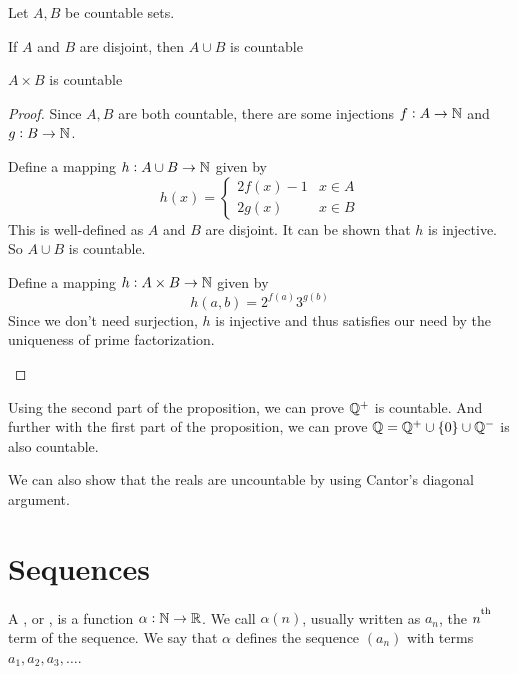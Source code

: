 \documentclass{styles/tufte}
\begin{document}
    \begin{proposition}{}{}
      Let $A, B$ be countable sets.
      \begin{romanenum}
        \item If $A$ and $B$ are disjoint, then $A \cup B$ is countable
        \item $A \times B$ is countable
      \end{romanenum}
    \end{proposition}
    \begin{proof}
      Since $A, B$ are both countable, there are some injections $f : A \to \mathbb{N}$ and $g : B \to \mathbb{N}$.
      \begin{romanenum}
        \item Define a mapping $h : A \cup B \to \mathbb{N}$ given by
          \[ h(x) = \begin{cases} 2f(x) - 1 & x \in A \\ 2g(x) & x \in B \end{cases} \]
          This is well-defined as $A$ and $B$ are disjoint. It can be shown that $h$ is injective. So $A \cup B$ is countable.
        \item Define a mapping $h : A \times B \to \mathbb{N}$ given by
          \[ h(a, b) = 2^{f(a)} 3^{g(b)} \]
          Since we don't need surjection, $h$ is injective and thus satisfies our need by the uniqueness of prime factorization. \qedhere
      \end{romanenum}
    \end{proof}
    
    Using the second part of the proposition, we can prove $\mathbb{Q}^+$ is countable. And further with the first part of the proposition, we can prove $\mathbb{Q} = \mathbb{Q}^+ \cup \set{0} \cup \mathbb{Q}^-$ is also countable.
    
    We can also show that the reals are uncountable by using Cantor's diagonal argument.





\section{Sequences}
  
  \begin{definition}{}{}
    A , or , is a function $\alpha : \mathbb{N} \to \mathbb{R}$. We call $\alpha(n)$, usually written as $a_n$, the $n^\textsuperscript{th}$ term of the sequence. We say that $\alpha$ defines the sequence $(a_n)$ with terms $a_1, a_2, a_3, \dots$.
  \end{definition}
  
\end{document}
